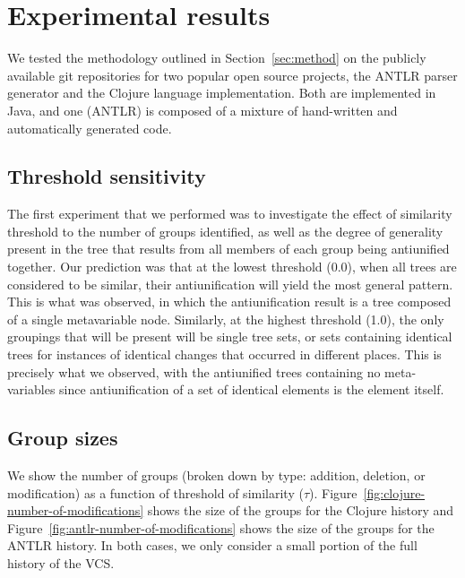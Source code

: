 \section{Experimental results}

We tested the methodology outlined in Section~\ref{sec:method} on the
publicly available git repositories for two popular open source
projects, the ANTLR parser generator and the Clojure language implementation.
Both are implemented in Java, and one (ANTLR) is composed of a mixture of
hand-written and automatically generated code.  

\subsection{Threshold sensitivity}
\label{sec:threshold}

The first experiment that we performed was to investigate the effect of
similarity threshold to the number of groups identified, as well as the degree
of generality present in the tree that results from all members of each group
being antiunified together. Our prediction was that at the lowest threshold
(0.0), when all trees are considered to be similar, their antiunification will
yield the most general pattern.  This is what was observed, in which the
antiunification result is a tree composed of a single metavariable node.
Similarly, at the highest threshold (1.0), the only groupings that will be
present will be single tree sets, or sets containing identical trees for
instances of identical changes that occurred in different places.  This is
precisely what we observed, with the antiunified trees containing no meta-
variables since antiunification of a set of identical elements is the element
itself.

\subsection{Group sizes}
\label{sec:groups}
  
We show the number of groups (broken down by type: addition, deletion, or
modification) as a function of threshold of similarity ($\tau$).
Figure~\ref{fig:clojure-number-of-modifications} shows the size of the groups
for the Clojure history and Figure~\ref{fig:antlr-number-of-modifications}
shows the size of the groups for the ANTLR history. In both cases, we only
consider a small portion of the full history of the VCS.

